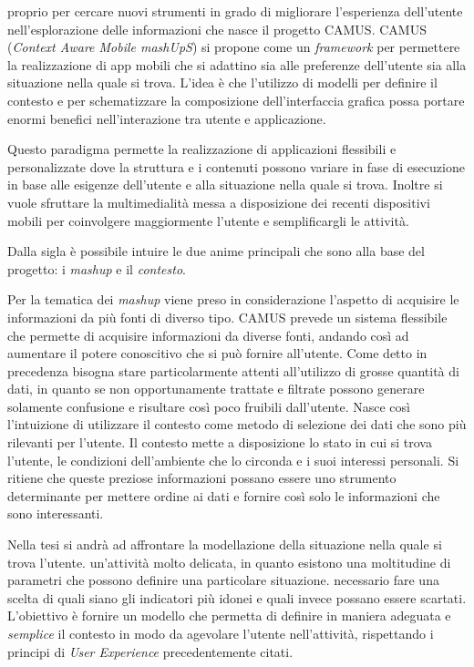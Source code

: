 \upe proprio per cercare nuovi strumenti in grado di migliorare l'esperienza dell'u\-ten\-te nell'esplorazione delle informazioni che nasce il progetto CAMUS. CAMUS (\emph{Context Aware Mobile mashUpS}) si propone come un \emph{framework} per permettere la realizzazione di app mobili che si adattino sia alle preferenze dell'utente sia alla situazione nella quale si trova. L'idea è che l'utilizzo di modelli per definire il contesto e per schematizzare la composizione dell'interfaccia grafica possa portare enormi benefici nell'interazione tra utente e applicazione.

Questo paradigma permette la realizzazione di applicazioni flessibili e personalizzate dove la struttura e i contenuti possono variare in fase di esecuzione in base alle esigenze dell'utente e alla situazione nella quale si trova. Inoltre si vuole sfruttare la multimedialità messa a disposizione dei recenti dispositivi mobili per coinvolgere maggiormente l'utente e semplificargli le attività.

Dalla sigla è possibile intuire le due anime principali che sono alla base del progetto: i \emph{mashup} e il \emph{contesto}.

Per la tematica dei \emph{mashup} viene preso in considerazione l'aspetto di acquisire le informazioni da più fonti di diverso tipo. CAMUS prevede un sistema flessibile che permette di acquisire informazioni da diverse fonti, andando così ad aumentare il potere conoscitivo che si può fornire all'utente. Come detto in precedenza bisogna stare particolarmente attenti all'utilizzo di grosse quantità di dati, in quanto se non opportunamente trattate e filtrate possono generare solamente confusione e risultare così poco fruibili dall'utente. Nasce così l'intuizione di utilizzare il contesto come metodo di selezione dei dati che sono più rilevanti per l'utente. Il contesto mette a disposizione lo stato in cui si trova l'utente, le condizioni dell'ambiente che lo circonda e i suoi interessi personali. Si ritiene che queste preziose informazioni possano essere uno strumento determinante per mettere ordine ai dati e fornire così solo le informazioni che sono interessanti.

Nella tesi si andrà ad affrontare la modellazione della situazione nella quale si trova l'utente. \upe un'attività molto delicata, in quanto esistono una moltitudine di parametri che possono definire una particolare situazione. \upe necessario fare una scelta di quali siano gli indicatori più idonei e quali invece possano essere scartati. L'obiettivo è fornire un modello che permetta di definire in maniera adeguata e \emph{semplice} il contesto in modo da agevolare l'utente nell'attività, rispettando i principi di \emph{User Experience} precedentemente citati.

